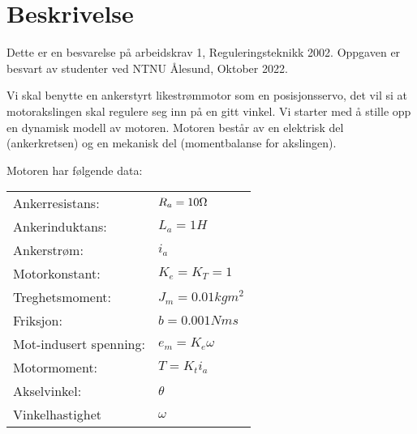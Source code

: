 \section{Beskrivelse}

Dette er en besvarelse på arbeidskrav 1, Reguleringsteknikk 2002. Oppgaven er besvart av studenter ved NTNU Ålesund, Oktober 2022.

Vi skal benytte en ankerstyrt likestrømmotor som en posisjonsservo, det vil si at motorakslingen skal regulere seg inn på en gitt vinkel. Vi starter med å stille opp en dynamisk modell av motoren. Motoren består av en elektrisk del (ankerkretsen) og en mekanisk del (momentbalanse for akslingen).

Motoren har følgende data:
\begin{center}































	\begin{tabular}{ll}
		Ankerresistans:        & $R_a = 10\ohm$    \\
		Ankerinduktans:        & $L_a = 1H$        \\
		Ankerstrøm:            & $i_a$             \\
		Motorkonstant:         & $K_e = K_T = 1$   \\
		Treghetsmoment:        & $J_m = 0.01kgm^2$ \\
		Friksjon:              & $b = 0.001Nms$    \\
		Mot-indusert spenning: & $e_m = K_e\omega$ \\
		Motormoment:           & $T = K_ti_a$      \\
		Akselvinkel:           & $\theta$          \\
		Vinkelhastighet        & $\omega$          \\
	\end{tabular}
\end{center}